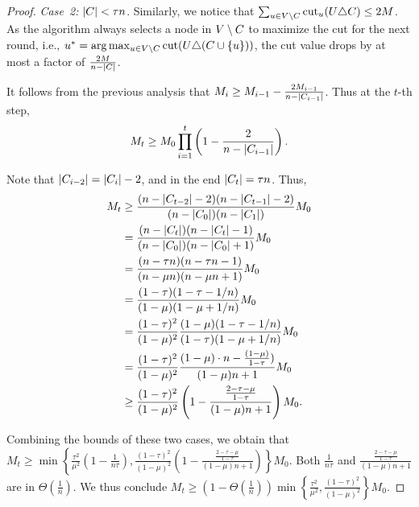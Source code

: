 \begin{proof}
\emph{Case~2:} $\lvert C\rvert < \tau n$.
Similarly, we notice that $\sum_{u\in V \setminus C} \mathrm{cut}_{u}\!\left(U \triangle C\right) \leq  2M$. 
As the algorithm always selects a node in $V \setminus C$ to
maximize the cut for the next round, i.e., $u^* = \arg \max_{u \in \vertices \setminus \SelectSet} \cut{\OldSet \symm (\SelectSet \cup \{u\})}$, the cut
value drops by at most a factor of $\frac{2M}{n - \lvert C\rvert}$. 

It follows from the previous analysis that $M_i \geq M_{i-1} - \frac{2M_{i-1}}{n-\lvert C_{i-1}\rvert}$. Thus at the $t$-th step, 
\begin{displaymath}
	M_t \geq M_0 \prod_{i=1}^t \left(1 - \frac{2}{n-\lvert C_{i-1}\rvert}\right). 
\end{displaymath}

Note that $\lvert C_{i-2}\rvert = \lvert C_{i}\rvert - 2$, and in the end $\lvert C_t\rvert = \tau n$. 
Thus,
\begin{displaymath}
	\begin{aligned}
		M_{t} &\geq \frac{(n - \lvert C_{t-2}\rvert-2)(n - \lvert C_{t-1}\rvert-2)}{(n - \lvert C_{0}\rvert)(n - \lvert C_{1}\rvert)} M_{0} \\
		&= \frac{(n - \lvert C_{t}\rvert)(n - \lvert C_{t}\rvert-1)}{(n - \lvert C_{0}\rvert)(n - \lvert C_{0}\rvert+1)} M_{0} \\
		&= \frac{(n - \tau n)(n - \tau n - 1)}{(n - \mu n) (n - \mu n + 1)} M_{0}\\
		&= \frac{(1- \tau )(1 - \tau  - 1/n)}{(1 - \mu ) (1 - \mu  + 1/n)} M_{0}\\
		&= \frac{(1- \tau )^2}{(1 - \mu )^2}\frac{(1- \mu )(1 - \tau  - 1/n)}{(1 - \tau) (1 - \mu  + 1/n)} M_{0} \\
  		&= \frac{(1- \tau )^2}{(1 - \mu )^2}\frac{(1- \mu )\cdot n - \frac{(1-\mu)}{1-\tau})}{(1 - \mu) n + 1} M_{0} \\
        &\geq \frac{(1- \tau )^2}{(1 - \mu )^2} \left(1 - \frac{\frac{2 - \tau - \mu}{1 - \tau}}{(1 - \mu) n + 1}\right) M_0.
	\end{aligned}
\end{displaymath}

Combining the bounds of these two cases, we obtain that
$M_{t} \geq \min \left\{\frac{\tau^2}{\mu^2}(1 - \frac{1}{n\tau}),
		\frac{(1- \tau )^2}{(1 - \mu)^2} \left(1 - \frac{\frac{2 - \tau - \mu}{1 - \tau}}{(1 - \mu) n + 1}\right)\right\}M_0$.
Both $\frac{1}{n \tau}$ and $\frac{\frac{2 - \tau - \mu}{1 - \tau}}{(1 - \mu)n + 1}$ are in $\Theta(\frac{1}{n})$. 
We thus conclude $M_{t} \geq (1 - \Theta(\frac{1}{n}))\min \left\{\frac{\tau^2}{\mu^2}, \frac{(1-\tau)^2}{(1 - \mu)^2}\right\} M_0$. 
\end{proof}

